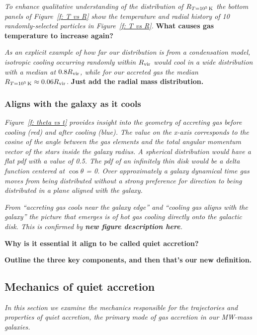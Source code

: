 \documentclass[fleqn,usenatbib]{mnras}
\newcommand{\Rcon}{R_{T=10^5\,{\rm K}}}
\begin{document}
\textit{
To enhance qualitative understanding of the distribution of $\Rcon$ the bottom panels of Figure~\ref{f: T vs R} show the temperature and radial history of 10 randomly-selected particles in Figure~\ref{f: T vs R}.
}
\textbf{
What causes gas temperature to increase again?
}

\textit{
As an explicit example of how far our distribution is from a condensation model, isotropic cooling occurring randomly within $R_{\rm vir}$ would cool in a wide distribution with a median at $0.8 R_{\rm vir}$, while for our accreted gas the median $\Rcon \approx 0.06 R_{\rm vir}$.
}
\textbf{Just add the radial mass distribution.}

\subsubsection{Aligns with the galaxy as it cools}
\label{s: aligns}

\textit{
Figure~\ref{f: theta vs t} provides insight into the geometry of accreting gas before cooling (red) and after cooling (blue).
The value on the x-axis corresponds to the cosine of the angle between the gas elements and the total angular momentum vector of the stars inside the galaxy radius.
A spherical distribution would have a flat pdf with a value of 0.5.
The pdf of an infinitely thin disk would be a delta function centered at $\cos\theta$ = 0.
Over approximately a galaxy dynamical time gas moves from being distributed without a strong preference for direction to being distributed in a plane aligned with the galaxy.
}

\textit{
From ``accreting gas cools near the galaxy edge'' and ``cooling gas aligns with the galaxy'' the picture that emerges is of hot gas cooling directly onto the galactic disk.
This is confirmed by \textbf{new figure description here}.
}

\textbf{Why is it essential it align to be called quiet accretion?}


\textbf{Outline the three key components, and then that's our new definition.}

\subsection{Mechanics of quiet accretion}
\label{s: mechanics}

\textit{
In this section we examine the mechanics responsible for the trajectories and properties of quiet accretion, the primary mode of gas accretion in our MW-mass galaxies.
}
\end{document}
